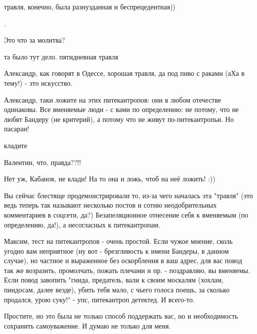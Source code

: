 \begin{itemize}
травля, конечно, была разнузданная и беспрецедентная))

.


Это что за молитва?

\begin{itemize} %
та было тут дело. пятидневная травля

Александр, как говорят в Одессе, хорошая травля, да под пиво с раками (аХа в тему!) - это искусство.
\end{itemize} %


Александр, таки ложите на этих питекантропов: они в любом отечестве одинаковы.
Все вменяемые люди - с вами по определению: не потому, что не любят Бандеру (не
критерий), а потому что не живут по-питекантропьи. Но пасаран!

\begin{itemize} %
кладите

Валентин, что, правда??!!


Нет уж, Кабанов, не клади! На то она и ложь, чтоб на неё ложить! :))


Вы сейчас блестяще продемонстрировали то, из-за чего началась эта "травля" (это
ведь теперь так называют несколько постов и сотню неодобрительных комментариев
в соцсети, да?) Безапеляционное отнесение себя к вменяемым (по определению,
да!), а несогласных к питекантропам.


Максим, тест на питекантропов - очень простой. Если чужое мнение, сколь угодно
вам неприятное (ну вот - брезгливость к имени Бандеры, в данном случае), но
частное и выраженное без оскорбления в ваш адрес, для вас повод так же
возразить, промолчать, пожать плечами и пр. - поздравляю, вы вменяемы. Если
повод завопить "гнида, предатель, вали к своим москалям (хохлам, пиндосам,
далее везде), убить тебя мало, с чьего голоса поешь, за сколько продался, урою
суку!" - упс, питекантроп детектед. И всего-то.

\end{itemize} %


Простите, но это была не только способ поддержать вас, но и необходимость
сохранить самоуважение. И думаю не только для меня.



\end{itemize}
